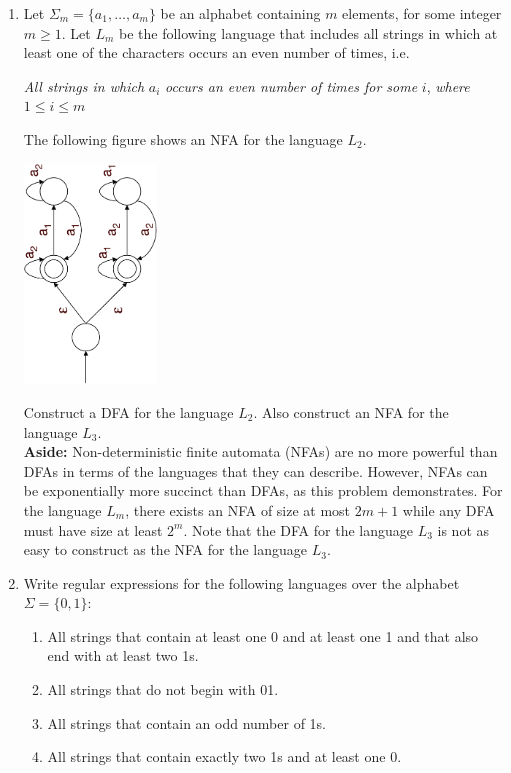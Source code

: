 \documentclass[11pt]{article}
\begin{document}
\begin{enumerate}
	\item Let $\Sigma_m = \{ a_1,\ldots,a_m \}$ be an alphabet containing $m$
	elements, for some integer $m \geq 1$.  Let $L_m$ be the following
	language that includes all strings in which at least one of the characters
	occurs an even number of times, i.e.
	\begin{center}
		\emph{All strings in which} $a_i$ \emph{occurs an even number of times for
			some} $i$, \emph{where} $1 \leq i \leq m$
	\end{center}
	The following figure shows an NFA for the language $L_2$. 
	\begin{center}
		\includegraphics[height=2.3in,angle=-90]{wa1-q2.pdf}
	\end{center}
	Construct a DFA for the language $L_2$. Also construct an NFA for the
	language $L_3$.
	\medskip \\
	{\bf Aside:}
	Non-deterministic finite automata (NFAs) are no more powerful than
	DFAs in terms of the languages that they can describe.  However, NFAs can
	be exponentially more succinct than DFAs, as this problem
	demonstrates. 
	For the language $L_m$, there exists an NFA of size at most $2m+1$  while any
	DFA must have size at least $2^m$. Note that the 
	DFA for the language $L_3$ is not as easy to construct as the NFA for
	the language $L_3$. 
	
	\newpage
	
	\item Write regular expressions for the following languages over the 
		alphabet $\Sigma = \{0,1\}$:
	\begin{enumerate}
		\item All strings that contain at least one 0 and at least one 1 and that also 
			end with at least two 1s.
		\item All strings that do not begin with 01.
		\item All strings that contain an odd number of 1s.
		\item All strings that contain exactly two 1s and at least one 0.
	\end{enumerate}
	

\end{enumerate}
\end{document}
